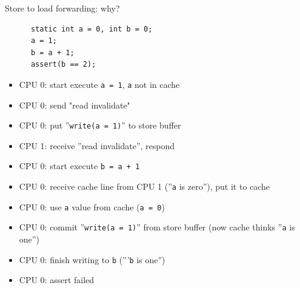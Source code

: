 \begin{frame}[fragile]{Store to load forwarding: why?}

\begin{center}
\begin{verbatim}
      static int a = 0, int b = 0;
      a = 1;
      b = a + 1;
      assert(b == 2);
\end{verbatim}
\end{center}

\begin{itemize}
    \pause
    \item CPU 0: start execute \texttt{a = 1}, \texttt{a} not in cache
    \pause
    \item CPU 0: send "read invalidate"
    \pause
    \item CPU 0: put ''\texttt{write(a = 1)}'' to store buffer
    \pause
    \item CPU 1: receive ''read invalidate'', respond
    \pause
    \item CPU 0: start execute \texttt{b = a + 1}
    \pause
    \item CPU 0: receive cache line from CPU 1 (''\texttt{a} is zero''), put it to cache
    \pause
    \item CPU 0: use \texttt{a} value from cache (\texttt{a = 0})
    \pause
    \item CPU 0: commit ''\texttt{write(a = 1)}'' from store buffer (now cache thinks ''\texttt{a} is one'')
    \pause
    \item CPU 0: finish writing to \texttt{b} ('''\texttt{b} is one'')
    \pause
    \item CPU 0: assert failed
\end{itemize}

\pause



\end{frame}

